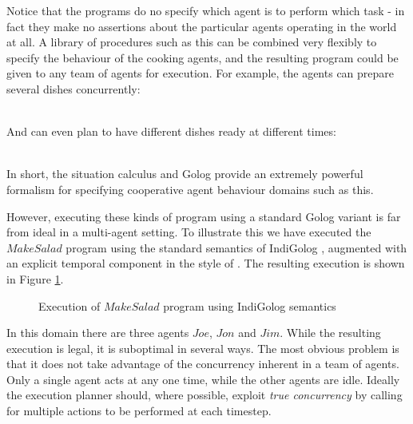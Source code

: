 Notice that the programs do no specify which agent is to perform which
task - in fact they make no assertions about the particular agents
operating in the world at all. A library of procedures such as this
can be combined very flexibly to specify the behaviour of the cooking
agents, and the resulting program could be given to any team of agents
for execution. For example, the agents can prepare several dishes
concurrently:

\\


And can even plan to have different dishes ready at different times:

\\


In short, the situation calculus and Golog provide an extremely powerful
formalism for specifying cooperative agent behaviour domains such
as this.

However, executing these kinds of program using a standard Golog variant
is far from ideal in a multi-agent setting. To illustrate this we
have executed the $MakeSalad$ program using the standard semantics
of IndiGolog \citep{giacomo99indigolog}, augmented with an explicit
temporal component in the style of \citep{Reiter98seq_temp_golog}.
The resulting execution is shown in Figure \ref{fig:MIndiGolog:MakeSalad-in-IndiGolog}.

%
\begin{figure}

\caption{Execution of $MakeSalad$ program using IndiGolog semantics\label{fig:MIndiGolog:MakeSalad-in-IndiGolog}}

\end{figure}


In this domain there are three agents $Joe$, $Jon$ and $Jim$. While
the resulting execution is legal, it is suboptimal in several ways.
The most obvious problem is that it does not take advantage of the
concurrency inherent in a team of agents. Only a single agent acts
at any one time, while the other agents are idle. Ideally the execution
planner should, where possible, exploit \emph{true concurrency} by
calling for multiple actions to be performed at each timestep.

